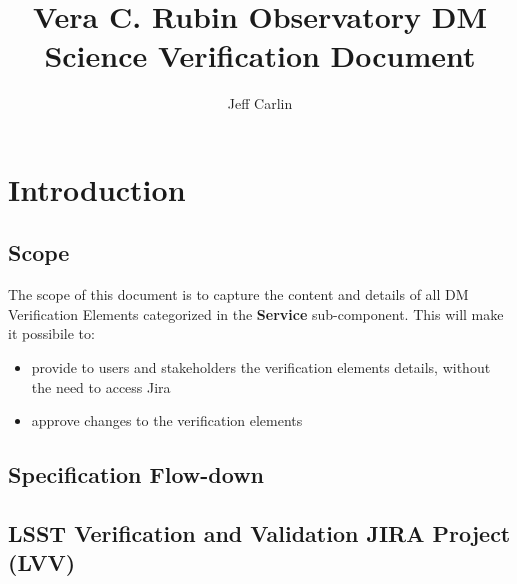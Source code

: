 \documentclass[DM,lsstdraft,STS,toc]{lsstdoc}
\begin{document}
\providecommand{\tightlist}{%
  \setlength{\itemsep}{0pt}\setlength{\parskip}{0pt}}

\def\product{LSST Data Management}


\title[DM Infrastructure Verification Document]{Vera C. Rubin Observatory DM Science Verification Document}

\author{Jeff Carlin}
\setDocRef{\lsstDocType-\lsstDocNum}
\setDocDate{\vcsDate}



\setDocUpstreamVersion{\vcsRevision}

\maketitle


\section{Introduction}\label{sec:intro}


\subsection{Scope}\label{sec:scope}

The scope of this document is to capture the content and details of all DM Verification Elements
categorized in the \textbf{Service} sub-component. This will make it possibile to:

\begin{itemize}
\item provide to users and stakeholders the verification elements details, without the need to access Jira
\item approve changes to the verification elements
\end{itemize}

\subsection{Specification Flow-down}\label{sec:sepcflowd}


\subsection{LSST Verification and Validation JIRA Project (LVV)}\label{sec:lvv}
\end{document}
